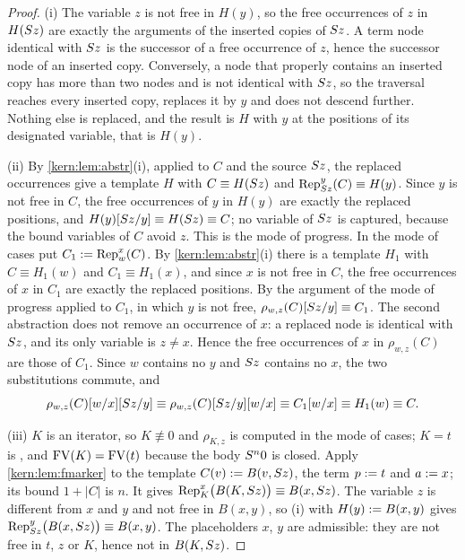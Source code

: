 \begin{proof}
(i) The variable $z$ is not free in $H(y)$, so the free occurrences of $z$ in
$H(S z)$ are exactly the arguments of the inserted copies of $S z$.  A
term node identical with $S z$ is the successor of a free occurrence of
$z$, hence the successor node of an inserted copy.  Conversely, a node that
properly contains an inserted copy has more than two nodes and is not
identical with $S z$, so the traversal reaches every inserted copy,
replaces it by $y$ and does not descend further.  Nothing else is replaced,
and the result is $H$ with $y$ at the positions of its designated variable,
that is $H(y)$.

(ii) By \cref{kern:lem:abstr}(i), applied to $C$ and the source $S z$,
the replaced occurrences give a template $H$ with $C\equiv H(S z)$ and
$\operatorname{Rep}_{S z}^{y}(C)\equiv H(y)$.  Since $y$ is not free in $C$,
the free occurrences of $y$ in $H(y)$ are exactly the replaced positions, and
$H(y)[S z/y]\equiv H(S z)\equiv C$; no variable of $S z$ is
captured, because the bound variables of $C$ avoid $z$.  This is the mode of
progress.  In the mode of cases put $C_1\mathrel{:=}\operatorname{Rep}_{w}^{x}(C)$.
By \cref{kern:lem:abstr}(i) there is a template $H_1$ with $C\equiv H_1(w)$ and
$C_1\equiv H_1(x)$, and since $x$ is not free in $C$, the free occurrences of
$x$ in $C_1$ are exactly the replaced positions.  By the argument of the mode
of progress applied to $C_1$, in which $y$ is not free,
$\rho_{w,z}(C)[S z/y]\equiv C_1$.  The second abstraction does not
remove an occurrence of $x$: a replaced node is identical with $S z$, and
its only variable is $z\neq x$.  Hence the free occurrences of $x$ in
$\rho_{w,z}(C)$ are those of $C_1$.  Since $w$ contains no $y$ and $S z$
contains no $x$, the two substitutions commute, and
\[
 \rho_{w,z}(C)[w/x][S z/y]
 \equiv\rho_{w,z}(C)[S z/y][w/x]
 \equiv C_1[w/x]\equiv H_1(w)\equiv C .
\]

(iii) $K$ is an iterator, so $K\not\equiv 0$ and $\rho_{K,z}$ is computed in
the mode of cases; $K=t$ is , and $\operatorname{FV}(K)=\operatorname{FV}(t)$ because the
body $S^{n}0$ is closed.  Apply \cref{kern:lem:fmarker} to the template
$C(v)\mathrel{:=} B(v,S z)$, the term $p\mathrel{:=} t$ and $a\mathrel{:=} x$; its bound
$1+|C|$ is $n$.  It gives
$\operatorname{Rep}_{K}^{x}\bigl(B(K,S z)\bigr)\equiv B(x,S z)$.  The
variable $z$ is different from $x$ and $y$ and not free in $B(x,y)$, so (i)
with $H(y)\mathrel{:=} B(x,y)$ gives
$\operatorname{Rep}_{S z}^{y}\bigl(B(x,S z)\bigr)\equiv B(x,y)$.  The
placeholders $x$, $y$ are admissible: they are not free in $t$, $z$ or $K$,
hence not in $B(K,S z)$.
\end{proof}

